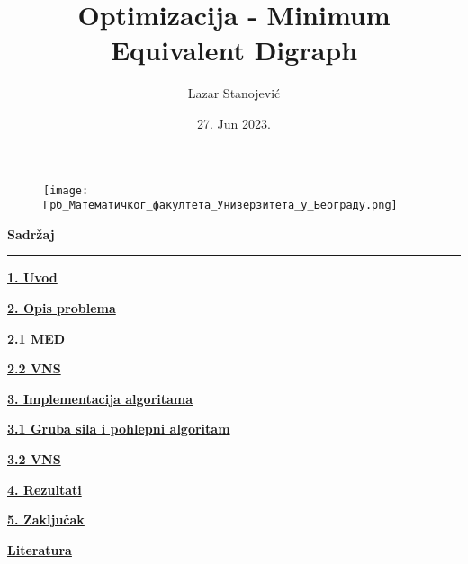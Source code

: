 \documentclass{article}
\begin{document}
\title{\fontsize{36}{22}\selectfont Optimizacija - Minimum Equivalent Digraph}
\author{\fontsize{20}{18}\selectfont Lazar Stanojević}
\date{27. Jun 2023.}
\maketitle   

\begin{figure}[b]
  \centering
  \texttt{[image: Грб\_Математичког\_факултета\_Универзитета\_у\_Београду.png]}
\end{figure}


\newpage

\begin{center}
\textbf{\huge Sadržaj}
\end{center}

\hrule

\bigskip

\textbf{\Large \hyperref[sec:uvod]{1. Uvod}} 

\medskip

\textbf{\Large \hyperref[sec:opis]{2. Opis problema}} 

\medskip

\textbf{\hspace{0.5cm} \Large \hyperref[sec:med]{2.1 MED}} 

\medskip

\textbf{\hspace{0.5cm} \Large \hyperref[sec:vns]{2.2 VNS}} 

\medskip

\textbf{\Large \hyperref[sec:impl]{3. Implementacija algoritama}} 

\medskip

\textbf{\hspace{0.5cm} \Large \hyperref[sec:gspa]{3.1 Gruba sila i pohlepni algoritam}} 

\medskip

\textbf{\hspace{0.5cm} \Large \hyperref[sec:vnsi]{3.2 VNS}} 

\medskip

\textbf{\Large \hyperref[sec:rez]{4. Rezultati}} 

\medskip

\textbf{\Large \hyperref[sec:zak]{5. Zaključak}} 

\medskip

\textbf{\Large \hyperref[sec:literatura]{Literatura}} 
\end{document}
